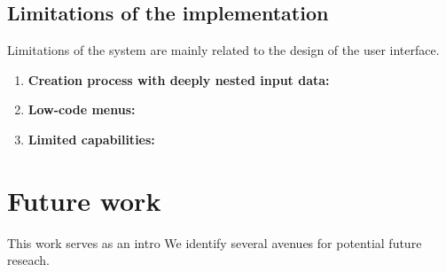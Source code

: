 \subsection{Limitations of the implementation}

Limitations of the system are mainly related to the design of the user interface.
\begin{enumerate}
	\item \textbf{Creation process with deeply nested input data:}
	\item \textbf{Low-code menus:}
	\item \textbf{Limited capabilities:}
\end{enumerate}


\section{Future work}
This work serves as an intro
We identify several avenues for potential future reseach.
